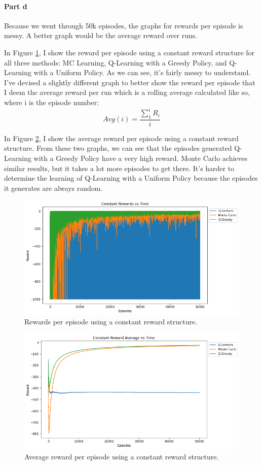 \documentclass[12pt]{article}
\begin{document}
\paragraph{Part d}

Because we went through 50k episodes, the graphs for rewards per episode is messy. A better graph would be the average reward over runs.

In Figure \ref{fig:crvt}, I show the reward per episode using a constant reward structure for all three methods: MC Learning, Q-Learning with a Greedy Policy, and Q-Learning with a Uniform Policy. As we can see, it's fairly messy to understand. I've devised a slightly different graph to better show the reward per episode that I deem the average reward per run which is a rolling average calculated like so, where i is the episode number:
$$
  Avg(i) = \frac{\sum_1^i R_i}{i}
$$

In Figure \ref{fig:crt}, I show the average reward per episode using a constant reward structure. From these two graphs, we can see that the episodes generated Q-Learning with a Greedy Policy have a very high reward. Monte Carlo achieves similar results, but it takes a lot more episodes to get there. It's harder to determine the learning of Q-Learning with a Uniform Policy because the episodes it generates are always random.

\begin{figure}
  \includegraphics[width=0.95\linewidth]{Figures/constant-rewards-vs-time.png}
  \centering
  \caption{Rewards per episode using a constant reward structure.}
  \label{fig:crvt}
\end{figure}

\begin{figure}
  \includegraphics[width=0.95\linewidth]{Figures/constant-reward-average-vs-time.png}
  \centering
  \caption{Average reward per episode using a constant reward structure.}
  \label{fig:crt}
\end{figure}
\end{document}
